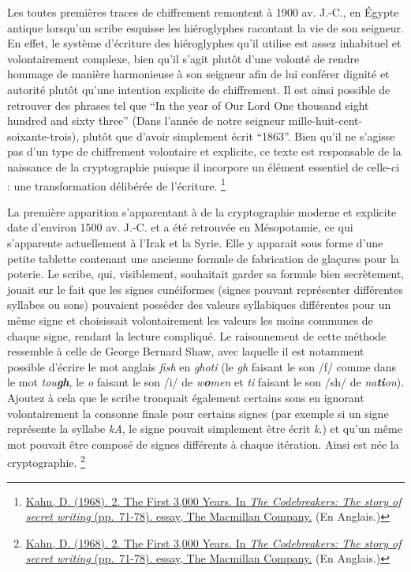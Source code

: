\documentclass[
  paper=a4,
  ,captions=tableheading
]{scrartcl}
\begin{document}
Les toutes premières traces de chiffrement remontent à 1900 av. J.-C.,
en Égypte antique lorsqu'un scribe esquisse les hiéroglyphes racontant
la vie de son seigneur. En effet, le système d'écriture des hiéroglyphes
qu'il utilise est assez inhabituel et volontairement complexe, bien
qu'il s'agit plutôt d'une volonté de rendre hommage de manière
harmonieuse à son seigneur afin de lui conférer dignité et autorité
plutôt qu'une intention explicite de chiffrement. Il est ainsi possible
de retrouver des phrases tel que ``In the year of Our Lord One thousand
eight hundred and sixty three'' (Dans l'année de notre seigneur
mille-huit-cent-soixante-trois), plutôt que d'avoir simplement écrit
``1863''. Bien qu'il ne s'agisse pas d'un type de chiffrement volontaire
et explicite, ce texte est responsable de la naissance de la
cryptographie puisque il incorpore un élément essentiel de celle-ci :
une transformation délibérée de l'écriture. \footnote{\href{https://archive.org/details/B-001-001-264/page/n47/mode/1up?view=theater}{Kahn,
  D. (1968). 2. The First 3,000 Years. In \emph{The Codebreakers: The
  story of secret writing} (pp.~71-78). essay, The Macmillan Company.}
  (En Anglais.)}

La première apparition s'apparentant à de la cryptographie moderne et
explicite date d'environ 1500 av. J.-C. et a été retrouvée en
Mésopotamie, ce qui s'apparente actuellement à l'Irak et la Syrie. Elle
y apparait sous forme d'une petite tablette contenant une ancienne
formule de fabrication de glaçures pour la poterie. Le scribe, qui,
visiblement, souhaitait garder sa formule bien secrètement, jouait sur
le fait que les signes cunéiformes (signes pouvant représenter
différentes syllabes ou sons) pouvaient posséder des valeurs syllabiques
différentes pour un même signe et choisissait volontairement les valeurs
les moins communes de chaque signe, rendant la lecture compliqué. Le
raisonnement de cette méthode ressemble à celle de George Bernard Shaw,
avec laquelle il est notamment possible d'écrire le mot anglais
\emph{fish} en \emph{ghoti} (le \emph{gh} faisant le son /f/ comme dans
le mot \emph{tou\textbf{gh}}, le \emph{o} faisant le son /i/ de
\emph{w\textbf{o}men} et \emph{ti} faisant le son /sh/ de
\emph{na\textbf{ti}on}). Ajoutez à cela que le scribe tronquait
également certains sons en ignorant volontairement la consonne finale
pour certains signes (par exemple si un signe représente la syllabe
\emph{kA}, le signe pouvait simplement être écrit \emph{k}.) et qu'un
même mot pouvait être composé de signes différents à chaque itération.
Ainsi est née la cryptographie. \footnote{\href{https://archive.org/details/B-001-001-264/page/n47/mode/1up?view=theater}{Kahn,
  D. (1968). 2. The First 3,000 Years. In \emph{The Codebreakers: The
  story of secret writing} (pp.~71-78). essay, The Macmillan Company.}
  (En Anglais.)}
\end{document}
